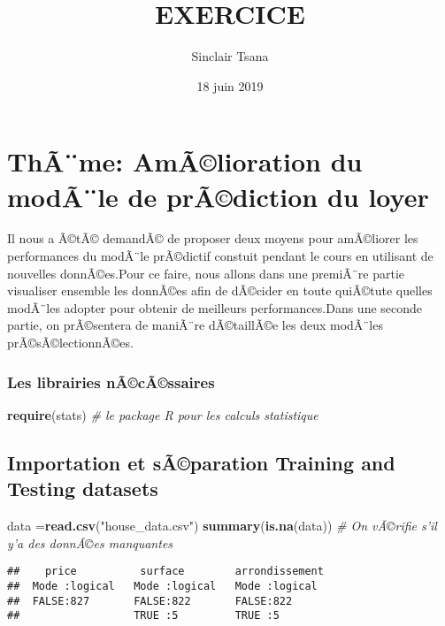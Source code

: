 \documentclass[]{article}
\title{EXERCICE}
\author{Sinclair Tsana}
\date{18 juin 2019}
\newenvironment{Shaded}{\begin{snugshade}}{\end{snugshade}}
\newcommand{\KeywordTok}[1]{\textcolor[rgb]{0.13,0.29,0.53}{\textbf{#1}}}
\newcommand{\StringTok}[1]{\textcolor[rgb]{0.31,0.60,0.02}{#1}}
\newcommand{\CommentTok}[1]{\textcolor[rgb]{0.56,0.35,0.01}{\textit{#1}}}
\newcommand{\NormalTok}[1]{#1}
\begin{document}
\maketitle

\section{ThÃ¨me: AmÃ©lioration du modÃ¨le de prÃ©diction du
loyer}\label{thame-amalioration-du-modale-de-pradiction-du-loyer}

Il nous a Ã©tÃ© demandÃ© de proposer deux moyens pour amÃ©liorer les
performances du modÃ¨le prÃ©dictif constuit pendant le cours en
utilisant de nouvelles donnÃ©es.Pour ce faire, nous allons dans une
premiÃ¨re partie visualiser ensemble les donnÃ©es afin de dÃ©cider en
toute quiÃ©tute quelles modÃ¨les adopter pour obtenir de meilleurs
performances.Dans une seconde partie, on prÃ©sentera de maniÃ¨re
dÃ©taillÃ©e les deux modÃ¨les prÃ©sÃ©lectionnÃ©es.

\subsubsection{Les librairies
nÃ©cÃ©ssaires}\label{les-librairies-nacassaires}

\begin{Shaded}
\begin{Highlighting}[]
\KeywordTok{require}\NormalTok{(stats)            }\CommentTok{# le package R pour les calculs statistique}
\end{Highlighting}
\end{Shaded}

\subsection{Importation et sÃ©paration Training and Testing
datasets}\label{importation-et-saparation-training-and-testing-datasets}

\begin{Shaded}
\begin{Highlighting}[]
\NormalTok{data =}\KeywordTok{read.csv}\NormalTok{(}\StringTok{"house_data.csv"}\NormalTok{)}
\KeywordTok{summary}\NormalTok{(}\KeywordTok{is.na}\NormalTok{(data))    }\CommentTok{# On vÃ©rifie s'il y'a des donnÃ©es manquantes }
\end{Highlighting}
\end{Shaded}

\begin{verbatim}
##    price          surface        arrondissement 
##  Mode :logical   Mode :logical   Mode :logical  
##  FALSE:827       FALSE:822       FALSE:822      
##                  TRUE :5         TRUE :5
\end{verbatim}
\end{document}
